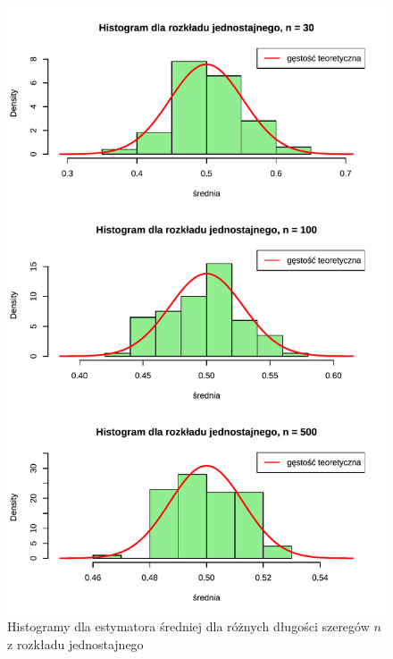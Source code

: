 \documentclass[10pt, a4paper]{article}\usepackage[]{graphicx}\usepackage[]{xcolor}
\makeatletter
\def\maxwidth{ %
  \ifdim\Gin@nat@width>\linewidth
    \linewidth
  \else
    \Gin@nat@width
  \fi
}
\newenvironment{knitrout}{}{} %
\makeatother
\begin{document}
\begin{knitrout}
\color{fgcolor}\begin{figure}[H]

{\centering \includegraphics[width=\maxwidth]{figure/analiza-sredniej-unif-hist-1} 

}

\caption[Histogramy dla estymatora średniej dla różnych długości szeregów $n$ z rozkładu jednostajnego]{Histogramy dla estymatora średniej dla różnych długości szeregów $n$ z rozkładu jednostajnego}\label{fig:analiza-sredniej-unif-hist}
\end{figure}

\end{knitrout}
\end{document}
